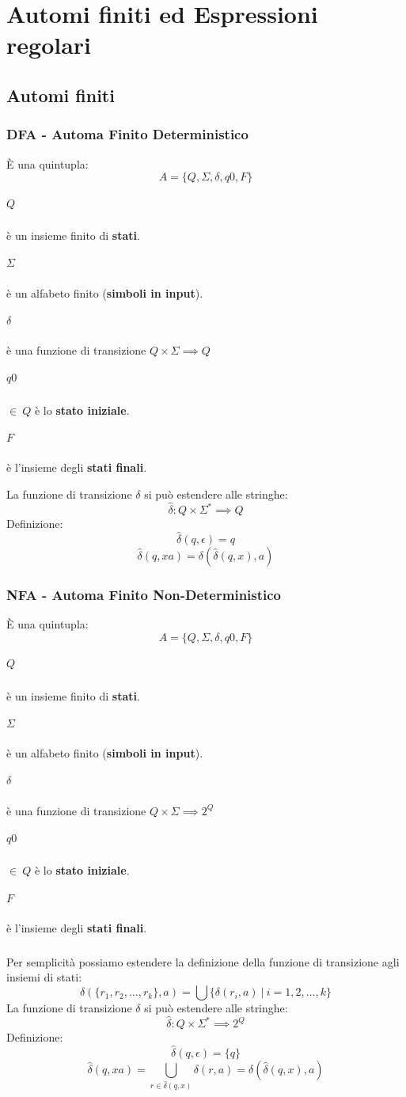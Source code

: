 \documentclass[14pt]{extarticle}
\begin{document}
\section{Automi finiti ed Espressioni regolari}
\subsection{Automi finiti}
\subsubsection{DFA - Automa Finito Deterministico}
È una quintupla:
\begin{equation*}
    A=\{Q,\Sigma,\delta,q0,F\}
\end{equation*}
\subparagraph*{$Q$} è un insieme finito di \textbf{stati}.
\subparagraph*{$\Sigma$} è un alfabeto finito (\textbf{simboli in input}).
\subparagraph*{$\delta$} è una funzione di transizione $Q\times\Sigma\implies Q$
\subparagraph*{$q0$} $\in\ Q$ è lo \textbf{stato iniziale}.
\subparagraph*{$F$} è l'insieme degli \textbf{stati finali}.

La funzione di transizione $\delta$ si può estendere alle stringhe:
\begin{equation*}
    \hat{\delta}:Q\times\Sigma^*\implies Q
\end{equation*}
Definizione:
\begin{equation*}
    \hat{\delta}(q,\epsilon)=q
\end{equation*}
\begin{equation*}
    \hat{\delta}(q,xa)=\delta(\hat{\delta}(q,x),a)  
\end{equation*}
\subsubsection{NFA - Automa Finito Non-Deterministico}
È una quintupla:
\begin{equation*}
    A=\{Q,\Sigma,\delta,q0,F\}
\end{equation*}
\subparagraph*{$Q$} è un insieme finito di \textbf{stati}.
\subparagraph*{$\Sigma$} è un alfabeto finito (\textbf{simboli in input}).
\subparagraph*{$\delta$} è una funzione di transizione $Q\times\Sigma\implies 2^Q$
\subparagraph*{$q0$} $\in\ Q$ è lo \textbf{stato iniziale}.
\subparagraph*{$F$} è l'insieme degli \textbf{stati finali}.
\subparagraph*{}
Per semplicità possiamo estendere la definizione della funzione di transizione
agli insiemi di stati:
\begin{equation*}
    \delta(\{r_1,r_2,\dots,r_k\},a)=\bigcup\{\delta(r_i,a)\ |\ i=1,2,\dots,k\}
\end{equation*}
La funzione di transizione $\delta$ si può estendere alle stringhe:
\begin{equation*}
    \hat{\delta}:Q\times\Sigma^*\implies 2^Q
\end{equation*}
Definizione:
\begin{equation*}
    \hat{\delta}(q,\epsilon)=\{q\}
\end{equation*}
\begin{equation*}
    \hat{\delta}(q,xa)=\bigcup_{r\in\hat{\delta}(q,x)}\delta(r,a)=\delta(\hat{\delta}(q,x),a)  
\end{equation*}
\end{document}
